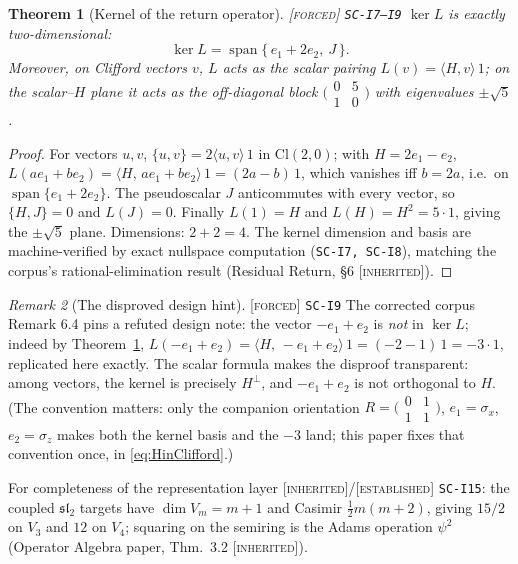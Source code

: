 \documentclass[11pt]{article}
\newcommand{\tagF}{\textcolor{cF}{\textsc{[forced]}}}
\newcommand{\tagI}{\textcolor{cI}{\textsc{[inherited]}}}
\newcommand{\tagE}{\textcolor{cE}{\textsc{[established]}}}
\newcommand{\hx}[1]{\textcolor{cC}{\footnotesize\texttt{#1}}}
\theoremstyle{plain}
\newtheorem{theorem}{Theorem}[section]
\theoremstyle{definition}
\theoremstyle{remark}
\newtheorem{remark}[theorem]{Remark}
\begin{document}
\begin{theorem}[Kernel of the return operator]\label{thm:kernel}\tagF{} \hx{SC-I7--I9}
$\ker L$ is exactly two-dimensional:
\[
\ker L=\operatorname{span}\{\,e_1+2e_2,\ J\,\}.
\]
Moreover, on Clifford vectors $v$, $L$ acts as the scalar pairing
$L(v)=\langle H,v\rangle\,1$; on the scalar--$H$ plane it acts as the off-diagonal
block $\bigl(\begin{smallmatrix}0&5\\1&0\end{smallmatrix}\bigr)$ with eigenvalues
$\pm\sqrt5$.
\end{theorem}

\begin{proof}
For vectors $u,v$, $\{u,v\}=2\langle u,v\rangle\,1$ in $\mathrm{Cl}(2,0)$; with
$H=2e_1-e_2$, $L(ae_1+be_2)=\langle H,\,ae_1+be_2\rangle\,1=(2a-b)\,1$, which vanishes
iff $b=2a$, i.e.\ on $\operatorname{span}\{e_1+2e_2\}$. The pseudoscalar $J$
anticommutes with every vector, so $\{H,J\}=0$ and $L(J)=0$. Finally $L(1)=H$ and
$L(H)=H^2=5\cdot1$, giving the $\pm\sqrt5$ plane. Dimensions: $2+2=4$. The kernel
dimension and basis are machine-verified by exact nullspace computation
(\hx{SC-I7, SC-I8}), matching the corpus's rational-elimination result
(Residual Return, \S6 \tagI{}).
\end{proof}

\begin{remark}[The disproved design hint]\label{rem:64}\tagF{} \hx{SC-I9}
The corrected corpus Remark 6.4 pins a refuted design note: the vector $-e_1+e_2$ is
\emph{not} in $\ker L$; indeed by Theorem~\ref{thm:kernel},
$L(-e_1+e_2)=\langle H,\,-e_1+e_2\rangle\,1=(-2-1)\,1=-3\cdot 1$, replicated here
exactly. The scalar formula makes the disproof transparent: among vectors, the kernel
is precisely $H^{\perp}$, and $-e_1+e_2$ is not orthogonal to $H$. (The convention
matters: only the companion orientation $R=\bigl(\begin{smallmatrix}0&1\\1&1
\end{smallmatrix}\bigr)$, $e_1=\sigma_x$, $e_2=\sigma_z$ makes both the kernel basis
and the $-3$ land; this paper fixes that convention once, in
\eqref{eq:HinClifford}.)
\end{remark}

For completeness of the representation layer \tagI{}/\tagE{} \hx{SC-I15}: the coupled
$\mathfrak{sl}_2$ targets have $\dim V_m=m+1$ and Casimir $\tfrac12 m(m+2)$, giving
$15/2$ on $V_3$ and $12$ on $V_4$; squaring on the semiring is the Adams operation
$\psi^2$ (Operator Algebra paper, Thm.\ 3.2 \tagI{}).
\end{document}
